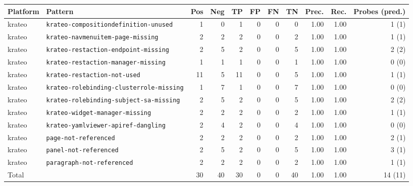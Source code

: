 \begin{tabular}{llrrrrrrrrr}
\toprule
Platform & Pattern & Pos & Neg & TP & FP & FN & TN & Prec. & Rec. & Probes (pred.) \\
\midrule
krateo & \texttt{krateo-compositiondefinition-unused} & 1 & 0 & 1 & 0 & 0 & 0 & 1.00 & 1.00 & 1 (1) \\
krateo & \texttt{krateo-navmenuitem-page-missing} & 2 & 2 & 2 & 0 & 0 & 2 & 1.00 & 1.00 & 1 (1) \\
krateo & \texttt{krateo-restaction-endpoint-missing} & 2 & 5 & 2 & 0 & 0 & 5 & 1.00 & 1.00 & 2 (2) \\
krateo & \texttt{krateo-restaction-manager-missing} & 1 & 1 & 1 & 0 & 0 & 1 & 1.00 & 1.00 & 0 (0) \\
krateo & \texttt{krateo-restaction-not-used} & 11 & 5 & 11 & 0 & 0 & 5 & 1.00 & 1.00 & 1 (1) \\
krateo & \texttt{krateo-rolebinding-clusterrole-missing} & 1 & 7 & 1 & 0 & 0 & 7 & 1.00 & 1.00 & 0 (0) \\
krateo & \texttt{krateo-rolebinding-subject-sa-missing} & 2 & 5 & 2 & 0 & 0 & 5 & 1.00 & 1.00 & 2 (2) \\
krateo & \texttt{krateo-widget-manager-missing} & 2 & 2 & 2 & 0 & 0 & 2 & 1.00 & 1.00 & 1 (1) \\
krateo & \texttt{krateo-yamlviewer-apiref-dangling} & 2 & 4 & 2 & 0 & 0 & 4 & 1.00 & 1.00 & 0 (0) \\
krateo & \texttt{page-not-referenced} & 2 & 2 & 2 & 0 & 0 & 2 & 1.00 & 1.00 & 2 (1) \\
krateo & \texttt{panel-not-referenced} & 2 & 5 & 2 & 0 & 0 & 5 & 1.00 & 1.00 & 3 (1) \\
krateo & \texttt{paragraph-not-referenced} & 2 & 2 & 2 & 0 & 0 & 2 & 1.00 & 1.00 & 1 (1) \\
\midrule
\multicolumn{2}{l}{Total} & 30 & 40 & 30 & 0 & 0 & 40 & 1.00 & 1.00 & 14 (11) \\
\bottomrule
\end{tabular}

